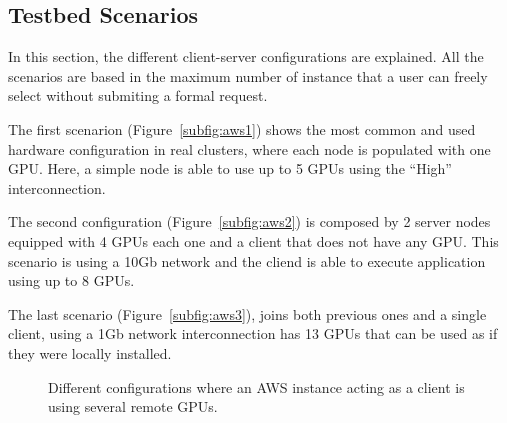 \documentclass[a4paper,twoside]{article}
\begin{document}
\subsection{Testbed Scenarios}
In this section, the different client-server configurations 
are explained. All the scenarios are based in the maximum number of instance 
that a user can freely select without submiting a formal request.

The first scenarion (Figure~\ref{subfig:aws1}) shows the most common 
and used hardware configuration in real clusters, where each node is 
populated with one GPU. Here, a simple node is able to use up to 5 GPUs 
using the ``High'' interconnection. 

The second configuration (Figure~\ref{subfig:aws2}) is composed by 2 server nodes equipped 
with 4 GPUs each one and a client that does not have any GPU. This scenario is using 
a 10Gb network and the cliend is able to execute application using up to 8 GPUs.

The last scenario (Figure~\ref{subfig:aws3}), joins both previous ones and a single client, 
using a 1Gb network interconnection has 13 GPUs that can be used as if they were locally installed.


\begin{figure}[ht]
\centering
{}
\quad
{}
\caption{Different configurations where an AWS instance acting as a client is using several remote GPUs.}
\label{fig:aws}
\end{figure}
\end{document}
